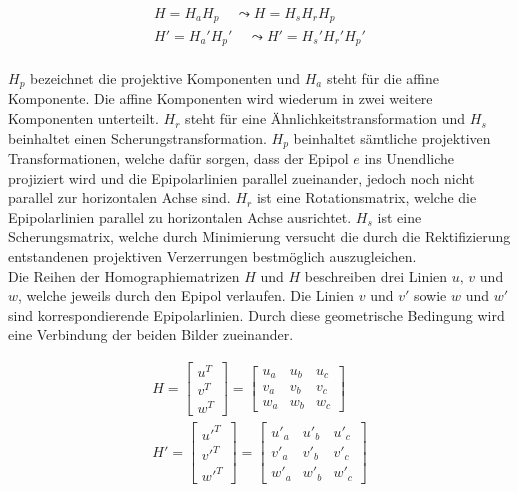 \begin{gather}
	H = H_a H_p  \;\;\;\; \leadsto	H = H_s H_r H_p \\
	H' = H_a'H_p'\;\;\;\; \leadsto 	H' = H_s'H_r' H_p'\\
\end{gather}


$H_p$ bezeichnet die projektive Komponenten und $H_a$ steht für die affine Komponente. Die affine Komponenten wird wiederum in zwei weitere Komponenten unterteilt. $H_r$ steht für eine Ähnlichkeitstransformation und $H_s$ beinhaltet einen Scherungstransformation. $H_p$ beinhaltet sämtliche projektiven Transformationen, welche dafür sorgen, dass der Epipol $e$ ins Unendliche projiziert wird und die Epipolarlinien parallel zueinander, jedoch noch nicht parallel zur horizontalen Achse sind\cite{ZZ,phdextrinsicPara}. $H_r$ ist eine Rotationsmatrix, welche die Epipolarlinien parallel zu horizontalen Achse ausrichtet. $H_s$ ist eine Scherungsmatrix, welche durch Minimierung versucht die durch die Rektifizierung entstandenen projektiven Verzerrungen bestmöglich auszugleichen\cite{ZZ,phdextrinsicPara}. \\

Die Reihen der Homographiematrizen $H$ und $H$ beschreiben drei Linien $u, \, v$ und $w$, welche jeweils durch den Epipol verlaufen. Die Linien $v$ und $v'$ sowie $w$ und $w'$ sind korrespondierende Epipolarlinien. Durch diese geometrische Bedingung wird eine Verbindung der beiden Bilder zueinander. 

\begin{gather}
	H = \begin{bmatrix}
		u^T\\v^T\\w^T
	\end{bmatrix} =
	\begin{bmatrix}
		u_a&u_b&u_c\\
		v_a&v_b&v_c\\
		w_a&w_b&w_c
	\end{bmatrix}\\
	H' = \begin{bmatrix}
		u'^T\\v'^T\\w'^T
	\end{bmatrix} =
	\begin{bmatrix}
		u'_a&u'_b&u'_c\\
		v'_a&v'_b&v'_c\\
		w'_a&w'_b&w'_c
	\end{bmatrix}	
\end{gather}\\

